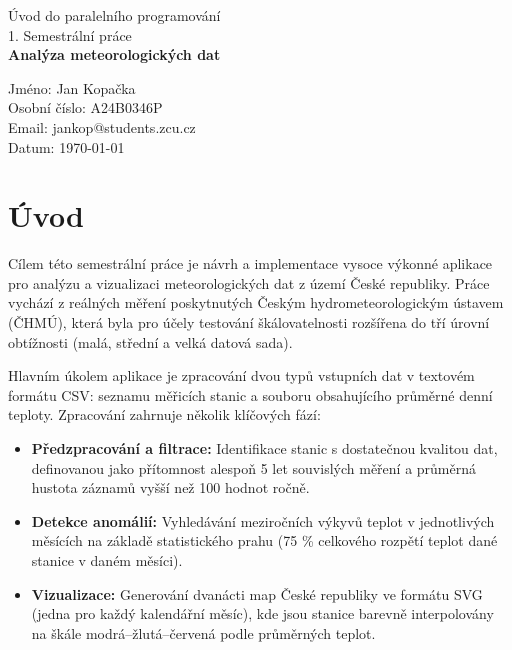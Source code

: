 \documentclass[10pt, a4paper]{report}
\begin{document}
	
	\thispagestyle{empty}
	
	\begin{titlepage}
		\centering
		
		{\Large Úvod do paralelního programování} \\[0.5cm]
		{\Large 1. Semestrální práce} \\[2.5cm]
		
		{\huge \bfseries Analýza meteorologických dat} \\[0cm]
		
		\vfill
		
		\begin{flushleft} \small
			Jméno: Jan Kopačka \\
			Osobní číslo: A24B0346P \\
			Email: jankop@students.zcu.cz \\
			Datum: \today
		\end{flushleft}
		
	\end{titlepage}
	
	\setcounter{page}{2}
	
	\tableofcontents
	\newpage
	
	\chapter{Úvod}
	
	Cílem této semestrální práce je návrh a implementace vysoce výkonné aplikace pro analýzu a vizualizaci meteorologických dat z území České republiky. Práce vychází z reálných měření poskytnutých Českým hydrometeorologickým ústavem (ČHMÚ), která byla pro účely testování škálovatelnosti rozšířena do tří úrovní obtížnosti (malá, střední a velká datová sada).
	
	Hlavním úkolem aplikace je zpracování dvou typů vstupních dat v textovém formátu CSV: seznamu měřicích stanic a souboru obsahujícího průměrné denní teploty. Zpracování zahrnuje několik klíčových fází:
	\begin{itemize}
		\item \textbf{Předzpracování a filtrace:} Identifikace stanic s dostatečnou kvalitou dat, definovanou jako přítomnost alespoň 5 let souvislých měření a průměrná hustota záznamů vyšší než 100 hodnot ročně.
		\item \textbf{Detekce anomálií:} Vyhledávání meziročních výkyvů teplot v jednotlivých měsících na základě statistického prahu (75 \% celkového rozpětí teplot dané stanice v daném měsíci).
		\item \textbf{Vizualizace:} Generování dvanácti map České republiky ve formátu SVG (jedna pro každý kalendářní měsíc), kde jsou stanice barevně interpolovány na škále modrá–žlutá–červená podle průměrných teplot.
	\end{itemize}
	
\end{document}
